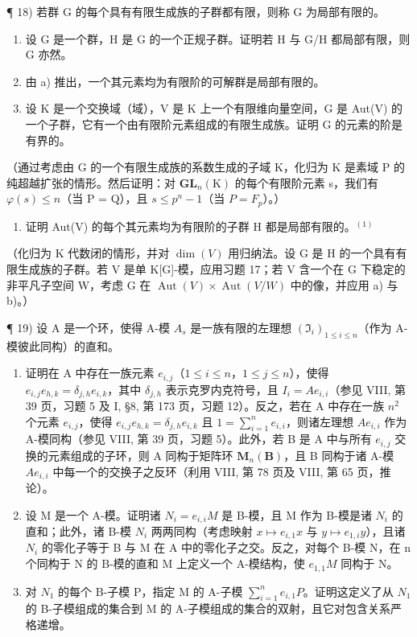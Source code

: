 ¶ 18) 若群 G 的每个具有有限生成族的子群都有限，则称 G 为局部有限的。

\begin{enumerate}
\def\labelenumi{\alph{enumi})}
\item
  设 G 是一个群，H 是 G 的一个正规子群。证明若 H 与 G/H 都局部有限，则 G 亦然。
\item
  由 a) 推出，一个其元素均为有限阶的可解群是局部有限的。
\item
  设 K 是一个交换域（域），V 是 K 上一个有限维向量空间，G 是 Aut(V) 的一个子群，它有一个由有限阶元素组成的有限生成族。证明 G 的元素的阶是有界的。
\end{enumerate}

（通过考虑由 G 的一个有限生成族的系数生成的子域 K，化归为 K 是素域 P 的纯超越扩张的情形。然后证明：对 \(\mathbf{GL}_{n}(\mathrm{K})\) 的每个有限阶元素 s，我们有 \(\varphi(s) \leqslant n\)（当 P = Q），且 \(s \leqslant p^{n} - 1\)（当 \(P = F_{p}\)）。）

\begin{enumerate}
\def\labelenumi{\alph{enumi})}
\setcounter{enumi}{3}
\tightlist
\item
  证明 Aut(V) 的每个其元素均为有限阶的子群 H 都是局部有限的。\(^{(1)}\)
\end{enumerate}

（化归为 K 代数闭的情形，并对 \(\dim(V)\) 用归纳法。设 G 是 H 的一个具有有限生成族的子群。若 V 是单 K{[}G{]}-模，应用习题 17；若 V 含一个在 G 下稳定的非平凡子空间 W，考虑 G 在 \(\operatorname{Aut}(V) \times \operatorname{Aut}(V/W)\) 中的像，并应用 a) 与 b)。）

¶ 19) 设 A 是一个环，使得 A-模 \(A_{s}\) 是一族有限的左理想 \((\mathfrak{I}_{i})_{1\leqslant i\leqslant n}\)（作为 A-模彼此同构）的直和。

\begin{enumerate}
\def\labelenumi{\alph{enumi})}
\item
  证明在 A 中存在一族元素 \(e_{i,j}\)（\(1 \leqslant i \leqslant n\)，\(1 \leqslant j \leqslant n\)），使得 \(e_{i,j}e_{h,k} = \delta_{j,h}e_{i,k}\)，其中 \(\delta_{j,h}\) 表示克罗内克符号，且 \(I_i = Ae_{i,i}\)（参见 VIII, 第 39 页，习题 5 及 I, §8, 第 173 页，习题 12）。反之，若在 A 中存在一族 \(n^2\) 个元素 \(e_{i,j}\)，使得 \(e_{i,j}e_{h,k} = \delta_{j,h}e_{i,k}\) 且 \(1 = \sum_{i=1}^{n} e_{i,i}\)，则诸左理想 \(Ae_{i,i}\) 作为 A-模同构（参见 VIII, 第 39 页，习题 5）。此外，若 B 是 A 中与所有 \(e_{i,j}\) 交换的元素组成的子环，则 A 同构于矩阵环 \(\mathbf{M}_n(\mathbf{B})\)，且 B 同构于诸 A-模 \(Ae_{i,i}\) 中每一个的交换子之反环（利用 VIII, 第 78 页及 VIII, 第 65 页，推论）。
\item
  设 M 是一个 A-模。证明诸 \(N_{i} = e_{i,i}M\) 是 B-模，且 M 作为 B-模是诸 \(N_{i}\) 的直和；此外，诸 B-模 \(N_{i}\) 两两同构（考虑映射 \(x \mapsto e_{i,1}x\) 与 \(y \mapsto e_{1,i}y\)），且诸 \(N_{i}\) 的零化子等于 B 与 M 在 A 中的零化子之交。反之，对每个 B-模 N，在 n 个同构于 N 的 B-模的直和 M 上定义一个 A-模结构，使 \(e_{1,1}M\) 同构于 N。
\item
  对 \(N_{1}\) 的每个 B-子模 P，指定 M 的 A-子模 \(\sum_{i=1}^{n} e_{i,1}P\)。证明这定义了从 \(N_{1}\) 的 B-子模组成的集合到 M 的 A-子模组成的集合的双射，且它对包含关系严格递增。
\end{enumerate}

